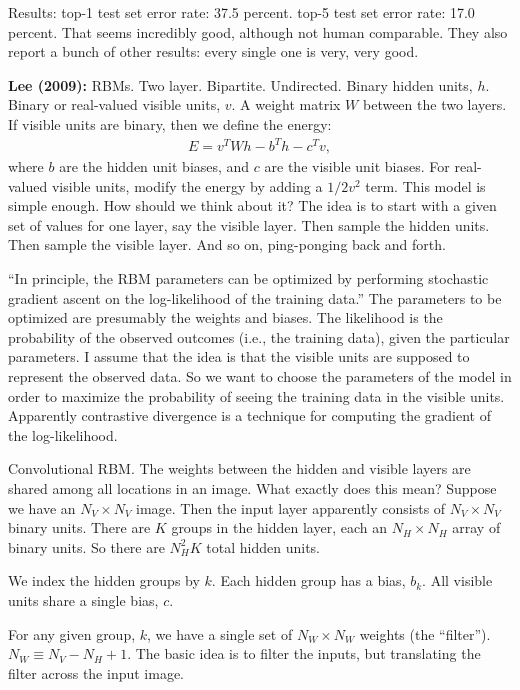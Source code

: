\documentclass[12pt]{article}
\begin{document}
Results: top-1 test set error rate: 37.5 percent.  top-5 test set
error rate: 17.0 percent.  That seems incredibly good, although not
human comparable.  They also report a bunch of other results: every
single one is very, very good.

\textbf{Lee (2009):} RBMs.  Two layer.  Bipartite.  Undirected.
Binary hidden units, $h$.  Binary or real-valued visible units, $v$.
A weight matrix $W$ between the two layers.  If visible units are
binary, then we define the energy:
\begin{eqnarray}
  E = v^T W h - b^T h-c^T v,
\end{eqnarray}
where $b$ are the hidden unit biases, and $c$ are the visible unit
biases.  For real-valued visible units, modify the energy by adding a
$1/2 v^2$ term.  This model is simple enough.  How should we think
about it?  The idea is to start with a given set of values for one
layer, say the visible layer.  Then sample the hidden units.  Then
sample the visible layer.  And so on, ping-ponging back and forth.

``In principle, the RBM parameters can be optimized by performing
stochastic gradient ascent on the log-likelihood of the training
data.''  The parameters to be optimized are presumably the weights and
biases.  The likelihood is the probability of the observed outcomes
(i.e., the training data), given the particular parameters.  I assume
that the idea is that the visible units are supposed to represent the
observed data.  So we want to choose the parameters of the model in
order to maximize the probability of seeing the training data in the
visible units.  Apparently contrastive divergence is a technique for
computing the gradient of the log-likelihood.

Convolutional RBM. The weights between the hidden and visible layers
are shared among all locations in an image.  What exactly does this
mean?  Suppose we have an $N_V \times N_V$ image.  Then the input
layer apparently consists of $N_V \times N_V$ binary units.  There are
$K$ groups in the hidden layer, each an $N_H \times N_H$ array of
binary units.  So there are $N_H^2 K$ total hidden units.

We index the hidden groups by $k$.  Each hidden group has a bias,
$b_k$.  All visible units share a single bias, $c$.

For any given group, $k$, we have a single set of $N_W \times N_W$
weights (the ``filter'').  $N_W \equiv N_V-N_H+1$.  The basic idea is
to filter the inputs, but translating the filter across the input
image.
\end{document}
